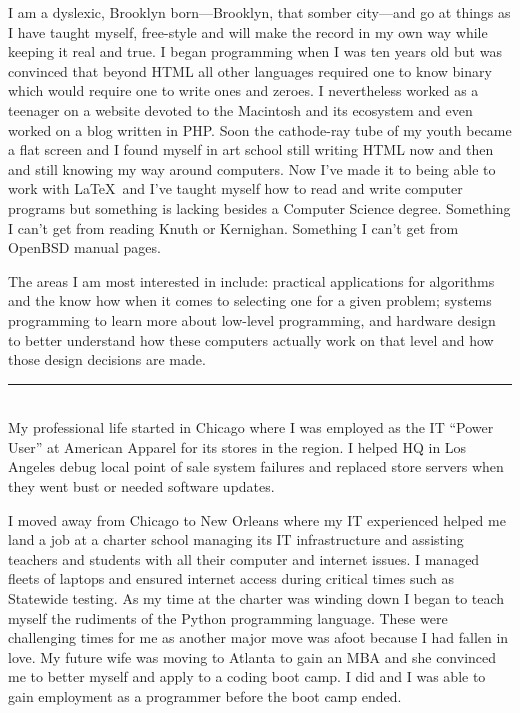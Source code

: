 \documentclass[12pt]{article}
\begin{document}
I am a dyslexic, Brooklyn born---Brooklyn, that somber city---and go at things as I have taught myself, free-style and will make the record in my own way while keeping it real and true.
I began programming when I was ten years old but was convinced that beyond HTML all other languages required one to know binary which would require one to write ones and zeroes. I nevertheless worked as a teenager on a website devoted to the Macintosh and its ecosystem and even worked on a blog written in PHP. Soon the cathode-ray tube of my youth became a flat screen and I found myself in art school still writing HTML now and then and still knowing my way around computers. Now I've made it to being able to work with \LaTeX\ and I've taught myself how to read and write computer programs but something is lacking besides a Computer Science degree. Something I can't get from reading Knuth or Kernighan. Something I can't get from OpenBSD manual pages.

The areas I am most interested in include: practical applications for algorithms and the know how when it comes to selecting one for a given problem; systems programming to learn more about low-level programming, and hardware design to better understand how these computers actually work on that level and how those design decisions are made.\\

\hrule\
\\

My professional life started in Chicago where I was employed as the IT ``Power User'' at American Apparel for its stores in the region. I helped HQ in Los Angeles debug local point of sale system failures and replaced store servers when they went bust or needed software updates.

I moved away from Chicago to New Orleans where my IT experienced helped me land a job at a charter school managing its IT infrastructure and assisting teachers and students with all their computer and internet issues. I managed fleets of laptops and ensured internet access during critical times such as Statewide testing. As my time at the charter was winding down I began to teach myself the rudiments of the Python programming language. These were challenging times for me as another major move was afoot because I had fallen in love. My future wife was moving to Atlanta to gain an MBA and she convinced me to better myself and apply to a coding boot camp. I did and I was able to gain employment as a programmer before the boot camp ended.
\end{document}
